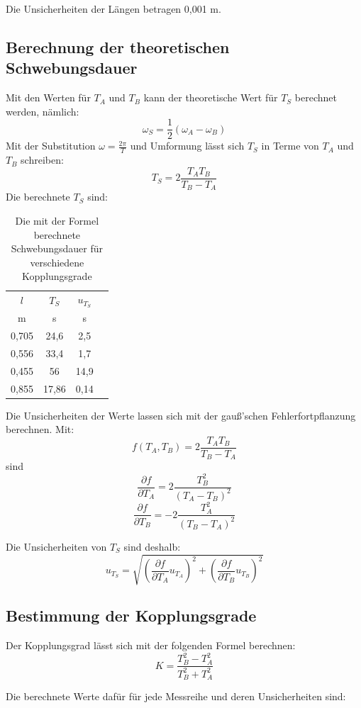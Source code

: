 \documentclass[11pt,a4paper]{article}
\begin{document}
Die Unsicherheiten der Längen betragen 0,001 m. 

\subsection{Berechnung der theoretischen Schwebungsdauer}
Mit den Werten für $T_A$ und $T_B$ kann der theoretische Wert für $T_S$ berechnet werden, nämlich:
$$\omega_S = \frac{1}{2}(\omega_A-\omega_B)$$
Mit der Substitution $\omega = \frac{2\pi}{T}$ und Umformung lässt sich $T_S$ in Terme von $T_A$ und $T_B$ schreiben:
\begin{equation}
T_S = 2\frac{T_A T_B}{T_B-T_A}
\end{equation}
Die berechnete $T_S$ sind:

\begin{table}[h]
	\centering
	\begin{tabular*}{0.99\textwidth}{@{\extracolsep{\fill}}cccc}
		\toprule
		$l$ & $T_S$ & $u_{T_S}$  \\
		m & s & s   \\
		\bottomrule
		0,705 & 24,6 & 2,5 \\
		0,556 & 33,4 & 1,7 \\
		0,455 & 56 & 14,9 \\
		0,855 & 17,86 & 0,14 \\
		\bottomrule
	\end{tabular*}
	\caption{Die mit der Formel berechnete Schwebungsdauer für verschiedene Kopplungsgrade}
	\label{tabelle}
\end{table}

Die Unsicherheiten der Werte lassen sich mit der gauß'schen Fehlerfortpflanzung berechnen. Mit:
$$f(T_A,T_B) = 2\frac{T_A T_B}{T_B-T_A}$$ 
sind
$$\frac{\partial f}{\partial T_A} = 2\frac{T_B^2}{(T_A-T_B)^2}$$
$$\frac{\partial f}{\partial T_B} = -2\frac{T_A^2}{(T_B-T_A)^2}$$

Die Unsicherheiten von $T_S$ sind deshalb:
$$u_{T_S} = \sqrt{(\frac{\partial f}{\partial T_A}u_{T_A})^2+(\frac{\partial f}{\partial T_B}u_{T_B})^2}$$

\subsection{Bestimmung der Kopplungsgrade}
Der Kopplungsgrad lässt sich mit der folgenden Formel berechnen:
\begin{equation}
K = \frac{T_B^2-T_A^2}{T_B^2+T_A^2}
\end{equation}

Die berechnete Werte dafür für jede Messreihe und deren Unsicherheiten sind: 
\end{document}
